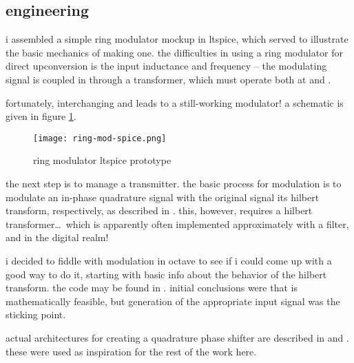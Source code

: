 \subsection*{engineering}
i assembled a simple ring modulator mockup in ltspice, which served to
illustrate the basic mechanics of making one. the difficulties in using a ring
modulator for direct upconversion is the input inductance and frequency -- the
modulating signal is coupled in through a transformer, which must operate both
at \rf and \ifreq.

fortunately, interchanging \rf and \ifreq leads to a still-working modulator! a
schematic is given in figure \ref{fig:ring-mod-spice}.

\begin{figure}[H]
	\centering
	\texttt{[image: ring-mod-spice.png]}
	\caption{ring modulator ltspice prototype}
	\label{fig:ring-mod-spice}
\end{figure}

the next step is to manage a \ssb transmitter. the basic process for \ssb
modulation is to modulate an in-phase \amp quadrature signal with the original
signal \amp its hilbert transform, respectively, as described in
\autocite{matlab-ssb}. this, however, requires a hilbert transformer\ldots\
which is apparently often implemented approximately with a filter, and in the
digital realm!

i decided to fiddle with \ssb modulation in octave to see if i could come up
with a good way to do it, starting with basic info about the behavior of the
hilbert transform. the code may be found in
. initial conclusions were that \ssb is
mathematically feasible, but generation of the appropriate input signal was the
sticking point.

actual architectures for creating a quadrature phase shifter are described in
\autocite{wideband-shifter} and \autocite{audio-shifter}. these were used as
inspiration for the rest of the work here.
